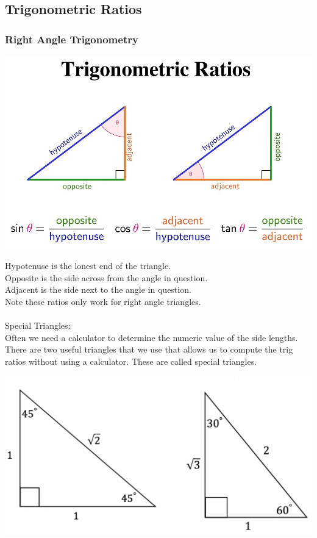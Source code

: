 \subsection{Trigonometric Ratios}

\subsubsection{Right Angle Trigonometry}
\centerline{\includegraphics[scale=0.3]{Images/FundamentalsPictures/TrigRatios.jpg}}
Hypotenuse is the lonest end of the triangle.\\
Opposite is the side across from the angle in question.\\
Adjacent is the side next to the angle in question.\\
Note these ratios only work for right angle triangles.\\
\\
Special Triangles:\\
Often we need a calculator to determine the numeric value of the side lengths. There are two useful triangles that we use that allows us to compute the trig ratios without using a calculator. These are called special triangles.\\
\centerline{\includegraphics[scale=0.5]{Images/FundamentalsPictures/SpecialTriangles.png}}

